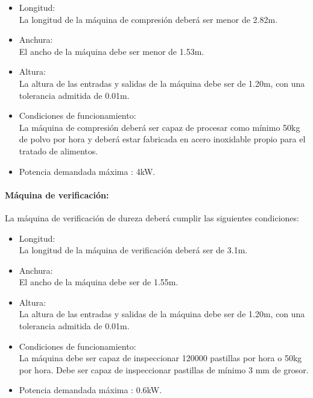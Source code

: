 		\begin{itemize}
			\item{Longitud:}\\
			La longitud de la máquina de compresión deberá ser menor de 2.82m.   

			\item{Anchura:}\\
			El ancho de la máquina debe ser menor de 1.53m.
			
			\item{Altura:}\\
			La altura de las entradas y salidas de la máquina debe ser de 1.20m, con una tolerancia admitida de 0.01m.
			
			
			\item{Condiciones de funcionamiento: }\\
			La máquina de compresión deberá ser capaz de procesar como mínimo 50kg de polvo por hora y deberá estar fabricada en acero inoxidable propio para el tratado de alimentos.
			

			\item{Potencia demandada máxima :} 4kW.
		
		\end{itemize}


\paragraph{Máquina de verificación:}
		La máquina de verificación de dureza deberá cumplir las siguientes condiciones:
		
		\begin{itemize}
			\item{Longitud:}\\
			La longitud de la máquina de verificación deberá ser de 3.1m. 

			\item{Anchura:}\\
			El ancho de la máquina debe ser de 1.55m.
			
			\item{Altura:}\\
			La altura de las entradas y salidas de la máquina debe ser de 1.20m, con una tolerancia admitida de 0.01m.
			
			
			\item{Condiciones de funcionamiento: }\\
			La máquina debe ser capaz de inspeccionar 120000 pastillas por hora o 50kg por hora. Debe ser capaz de inspeccionar pastillas de mínimo 3 mm de grosor.

			\item{Potencia demandada máxima :} 0.6kW.
		
		\end{itemize}



